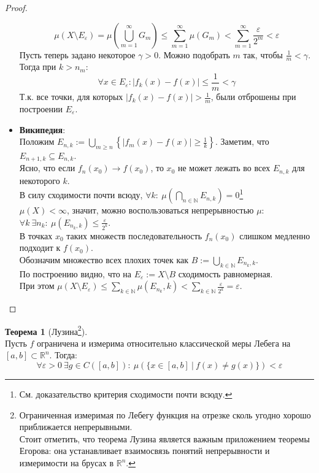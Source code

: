 \documentclass[11pt,a4paper]{report}
\def\eps{\varepsilon}
\def\Real{\mathbb{R}}
\def\Natural{\mathbb{N}}
\theoremstyle{definition}
\theoremstyle{definition}
\newtheorem{theorem}{Теорема}[section]
\theoremstyle{definition}
\begin{document}
\begin{proof}
\begin{itemize}
				\[ \mu(X \setminus E_{\eps}) = \mu\left (\bigcup\limits_{m=1}^{\infty}G_{m}\right ) \le \sum\limits_{m=1}^{\infty}\mu(G_{m}) < \sum\limits_{m=1}^{\infty}\frac{\eps}{2^{m}} < \eps \]
				Пусть теперь задано некоторое $ \gamma > 0 $. Можно подобрать $ m $ так, чтобы $ \frac{1}{m} < \gamma $.\\
				Тогда при $ k > n_{m} $:
				\[ \forall x \in E_{\eps}: |f_{k}(x) - f(x)| \le \frac{1}{m} < \gamma \]
				Т.к. все точки, для которых $ |f_{k}(x) - f(x)| > \frac{1}{m} $, были отброшены при построении $ E_{\eps} $.
			\item \textbf{Википедия}:\\
				Положим $ E_{n, k} := \bigcup\limits_{m \ge n}\left \{ |f_{m}(x) - f(x)|\ge \frac{1}{k} \right \} $. Заметим, что $ E_{n+1, k} \subseteq E_{n, k} $.\\
				Ясно, что если $ f_{n}(x_{0}) \to f(x_{0}) $, то $ x_{0} $ не может лежать во всех $ E_{n, k} $ для некоторого $ k $.\\
				В силу сходимости почти всюду, $ \forall k:\ \mu\left (\bigcap\limits_{n\in\Natural} E_{n, k}\right ) = 0 $\footnote{См. доказательство критерия сходимости почти всюду.}\\
				$ \mu(X) < \infty $, значит, можно воспользоваться непрерывностью $ \mu $: $ \forall k\ \exists n_{k}:\ \mu(E_{n_{k}, k}) \le \frac{\eps}{2^{k}} $.\\
				В точках $ x_{0} $ таких множеств последовательность $ f_{n}(x_{0}) $ слишком медленно подходит к $ f(x_{0}) $.\\
				Обозначим множество всех плохих точек как $ B := \bigcup\limits_{k \in \Natural} E_{n_{k}, k} $.\\
				По построению видно, что на $ E_{\eps} := X \setminus B $ сходимость равномерная.\\
				При этом $ \mu(X \setminus E_{\eps}) \le \sum_{k \in \Natural} \mu(E_{n_{k}}, k) < \sum_{k \in \Natural} \frac{\eps}{2^{k}} = \eps $.
			\end{itemize}
	\end{proof}
	\begin{theorem}[Лузина\footnote{Ограниченная измеримая по Лебегу функция  на отрезке сколь угодно хорошо приближается непрерывными.\\ Стоит отметить, что теорема Лузина является важным приложением теоремы Егорова: она устанавливает взаимосвязь понятий непрерывности и измеримости на брусах в $ \Real^{n} $.}]$  $\\
		Пусть $ f $ ограничена и измерима относительно классической меры Лебега на $ [a, b] \subset \Real^{n} $. 
		Тогда:
		\[ \forall \eps > 0\ \exists g \in C([a, b]):\ \mu(\{x \in [a, b]\ |\ f(x) \neq g(x) \}) < \eps \]
	\end{theorem}
\end{document}

